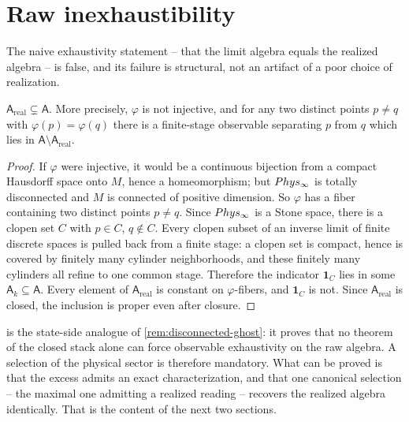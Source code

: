 \section{Raw inexhaustibility}
\label{sec:dyn-inexhaustible}
The naive exhaustivity statement -- that the limit algebra equals the
realized algebra -- is false, and its failure is structural, not an
artifact of a poor choice of realization.

\begin{theorem}
	\label{thm:dyn-raw-inexhaustible}
	\(\mathsf A_{\mathrm{real}}\subsetneq\mathsf A\). More precisely,
	\(\varphi\) is not injective, and for any two distinct points
	\(p\neq q\) with \(\varphi(p)=\varphi(q)\) there is a finite-stage
	observable separating \(p\) from \(q\) which lies in
	\(\mathsf A\setminus\mathsf A_{\mathrm{real}}\).
\end{theorem}
\begin{proof}
	If \(\varphi\) were injective, it would be a continuous bijection
	from a compact Hausdorff space onto \(M\), hence a homeomorphism;
	but \(Phys_\infty\) is totally disconnected and \(M\) is connected
	of positive dimension. So \(\varphi\) has a fiber containing two
	distinct points \(p\neq q\). Since \(Phys_\infty\) is a Stone
	space, there is a clopen set \(C\) with \(p\in C\), \(q\notin C\).
	Every clopen subset of an inverse limit of finite discrete spaces is
	pulled back from a finite stage: a clopen set is compact, hence is
	covered by finitely many cylinder neighborhoods, and these finitely
	many cylinders all refine to one common stage. Therefore the
	indicator \(\mathbf 1_C\) lies in some
	\(\mathsf A_k\subseteq\mathsf A\). Every element of
	\(\mathsf A_{\mathrm{real}}\) is constant on
	\(\varphi\)-fibers, and \(\mathbf 1_C\) is not. Since
	\(\mathsf A_{\mathrm{real}}\) is closed, the inclusion is proper
	even after closure.
\end{proof}

\begin{remark}
	 is the state-side analogue of
	\cref{rem:disconnected-ghost}: it proves that no theorem of the
	closed stack alone can force observable exhaustivity on the raw
	algebra. A selection of the physical sector is therefore mandatory.
	What can be proved is that the excess admits an exact
	characterization, and that one canonical selection -- the maximal
	one admitting a realized reading -- recovers the realized algebra
	identically. That is the content of the next two sections.
\end{remark}

